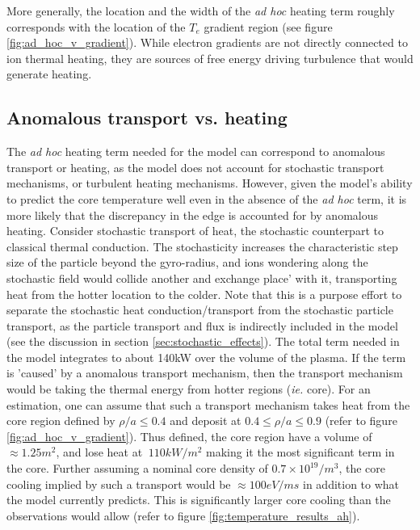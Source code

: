 More generally, the location and the width of the \textit{ad hoc} heating term roughly corresponds with the location of the $T_e$ gradient region (see figure \ref{fig:ad_hoc_v_gradient}). While electron gradients are not directly connected to ion thermal heating, they are sources of free energy driving turbulence that would generate heating. 

\subsection{Anomalous transport vs. heating}

The \textit{ad hoc} heating term needed for the model can correspond to anomalous transport or heating, as the model does not account for stochastic transport mechanisms, or turbulent heating mechanisms. However, given the model's ability to predict the core temperature well even in the absence of the \textit{ad hoc} term, it is more likely that the discrepancy in the edge is accounted for by anomalous heating. 
Consider stochastic transport of heat, the stochastic counterpart to classical thermal conduction. The stochasticity increases the characteristic step size of the particle beyond the gyro-radius, and ions wondering along the stochastic field would collide another and exchange place' with it, transporting heat from the hotter location to the colder. Note that this is a purpose effort to separate the stochastic heat conduction/transport from the stochastic particle transport, as the particle transport and flux is indirectly included in the model (see the discussion in section \ref{sec:stochastic_effects}). The total \adhoc term needed in the model integrates to about 140kW over the volume of the plasma. If the \adhoc term is 'caused' by a anomalous transport mechanism, then the transport mechanism would be taking the thermal energy from hotter regions (\textit{ie.} core). For an estimation, one can assume that such a transport mechanism takes heat from the core region defined by $\rho/a \leq 0.4$ and deposit at $0.4 \leq \rho/a \leq 0.9$ (refer to figure \ref{fig:ad_hoc_v_gradient}). Thus defined, the core region have a volume of $\approx 1.25 m^2$, and lose heat at $~110kW/m^2$ making it the most significant term in the core. Further assuming a nominal core density of $0.7 \times 10^{19}/m^3$, the core cooling implied by such a transport would be $\approx 100eV/ms$ in addition to what the model currently predicts. This is significantly larger core cooling than the observations would allow (refer to figure \ref{fig:temperature_results_ah}).

